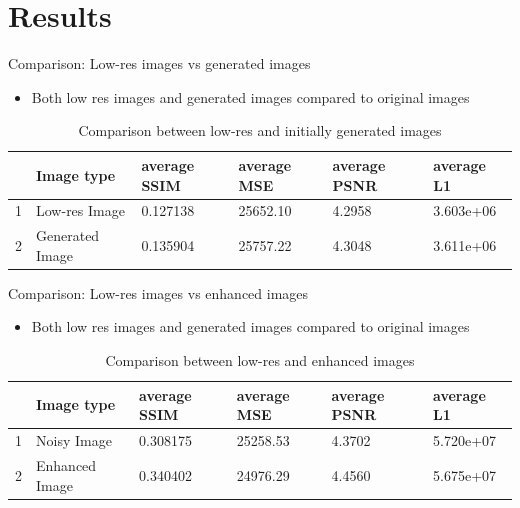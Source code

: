\documentclass{beamer}
\begin{document}
\section{Results}
	\begin{frame}{Comparison: Low-res images vs generated images}
		\begin{itemize}
			\item Both low res images and generated images compared to original images
		\end{itemize}
		\begin{table}[htbp]
			\caption{Comparison between low-res and initially generated images}
			\begin{center}
				\begin{tabular}{| p{0.2cm}| p{2cm}| p{1.5cm}|p{1.8cm}|p{1.5cm}|p{1.8cm}|}
					
					\hline
					
					& Image type      & average SSIM & average MSE  & average PSNR & average L1 \\ \hline
					
					1      & Low-res Image     & 0.127138     & 25652.10 & 4.2958    & 3.603e+06     \\ \hline
					
					2      & Generated Image & 0.135904     & 25757.22 & 4.3048    & 3.611e+06     \\ \hline
					
					
				\end{tabular}
				\label{tab1}
			\end{center}
		\end{table}
	\end{frame}
	
	\begin{frame}{Comparison: Low-res images vs enhanced images}
		\begin{itemize}
			\item Both low res images and generated images compared to original images
		\end{itemize}
		\begin{table}[htbp]
			\caption{Comparison between low-res and enhanced images}
			\begin{center}
				\begin{tabular}{| p{0.2cm}| p{2cm}| p{1.5cm}|p{1.8cm}|p{1.5cm}|p{1.8cm}|}
					
					\hline
					
					& Image type     & average SSIM & average MSE  & average PSNR & average L1 \\ \hline
					
					1      & Noisy Image    & 0.308175     & 25258.53 & 4.3702     & 5.720e+07     \\ \hline
					
					2      & Enhanced Image & 0.340402     & 24976.29 & 4.4560     & 5.675e+07     \\ \hline
					
				\end{tabular}
				\label{tab2}
			\end{center}
		\end{table}
	\end{frame}
\end{document}
